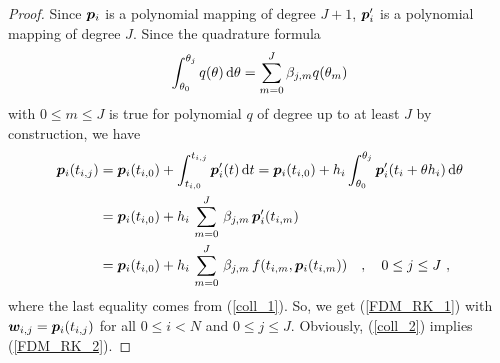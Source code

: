 \begin{proof}
  Since $\bm{p}_i$ is a polynomial mapping of degree $J+1$,
$\bm{p}_i'$ is a polynomial mapping of degree $J$.  Since the
quadrature formula
\begin{equation}\label{colRKorderJp1}
  \int_{\theta_0}^{\theta_j} q(\theta) \,\mathrm{d}\theta
  = \sum_{m=0}^J \beta_{j,m} q(\theta_m)
\end{equation}
with $0\leq m \leq J$ is true for polynomial $q$ of degree up to at
least $J$ by construction, we have
\begin{align*}
\bm{p}_i(t_{i,j}) &= \bm{p}_i(t_{i,0}) +
\int_{t_{i,0}}^{t_{i,j}} \bm{p}_i'(t) \,\mathrm{d}t
= \bm{p}_i(t_{i,0}) +
h_i \int_{\theta_0}^{\theta_j} \bm{p}_i'(t_i+\theta h_i) \,\mathrm{d}\theta \\
&= \bm{p}_i(t_{i,0}) +
h_i\,\sum_{m=0}^J\,\beta_{j,m}\,\bm{p}_i'(t_{i,m}) \\
&= \bm{p}_i(t_{i,0}) +
h_i\,\sum_{m=0}^J\,\beta_{j,m}\,f(t_{i,m},\bm{p}_i(t_{i,m})) \quad ,
\quad 0 \leq j \leq J \ , 
\end{align*}
where the last equality comes from
(\ref{coll_1}).  So, we get (\ref{FDM_RK_1}) with
$\bm{w}_{i,j} = \bm{p}_i(t_{i,j})$
for all $0\leq i < N$ and $0\leq j \leq J$.  Obviously,
(\ref{coll_2}) implies (\ref{FDM_RK_2}).


\end{proof}
